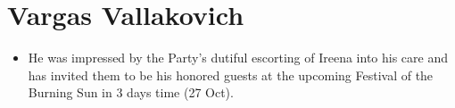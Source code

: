 \documentclass[a4paper,11pt]{article}
\begin{document}
\section{Vargas Vallakovich}
\begin{itemize}
  \item He was impressed by the Party's dutiful escorting of Ireena into his care and has invited them to be his
  honored guests at the upcoming Festival of the Burning Sun in 3 days time (27 Oct).
\end{itemize}
\end{document}
